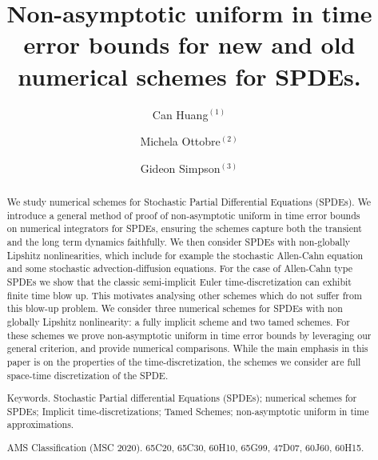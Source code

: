 \documentclass[reqno, 11pt]{amsart}
\theoremstyle{plain}
\theoremstyle{definition}
\theoremstyle{remark}
\numberwithin{equation}{section}
\numberwithin{theorem}{section}
\begin{document}
\title[Numerical schemes for SPDEs]{Non-asymptotic uniform in time error bounds for new and old  numerical schemes for SPDEs.}

\author[C. Huang]{Can Huang$^{(1)}$}
\address{$^{(1)}$School of Mathematical Sciences, Xiamen University, Xiamen 361005, Fujian, China}

\author[M. Ottobre]{Michela Ottobre$^{(2)}$}
\address{$^{(2)}$Maxwell Institute for Mathematical Sciences and Mathematics Department, Heriot-Watt University, Edinburgh EH14 4AS, UK}

\author[G. Simpson]{Gideon Simpson$^{(3)}$}
\address{$^{(3)}$Department of Mathematics, Drexel Univesrity, Philadelphia, 19104, USA}

\begin{abstract}
We study numerical schemes for Stochastic Partial Differential Equations (SPDEs).  We introduce a general  method of proof of non-asymptotic uniform in time error bounds on numerical integrators for SPDEs, ensuring the schemes capture both the transient and the long term dynamics faithfully.  We then consider SPDEs with non-globally Lipshitz nonlinearities, which include for example the stochastic Allen-Cahn equation and some stochastic  advection-diffusion equations. For the case of Allen-Cahn type SPDEs  we show that the classic semi-implicit Euler  time-discretization can exhibit finite time blow up. This motivates analysing other schemes which do not suffer from this blow-up problem. We consider three numerical schemes for  SPDEs with non globally Lipshitz nonlinearity: a fully implicit scheme and two tamed schemes.  For these schemes we prove non-asymptotic uniform in time error bounds by leveraging our general criterion, and provide numerical comparisons. While the main emphasis in this paper is on the properties of the time-discretization, the schemes we consider are full space-time discretization of the SPDE.   

	\vspace{5pt}
    \noindent
    {\sc Keywords.} Stochastic Partial differential Equations (SPDEs); numerical schemes for SPDEs; Implicit time-discretizations; Tamed Schemes; non-asymptotic uniform in time approximations. 
    
\vspace{5pt}
\noindent  
{\sc AMS Classification (MSC 2020). 65C20, 65C30, 60H10, 65G99, 47D07, 60J60, 60H15. } 
\end{abstract}
\end{document}
